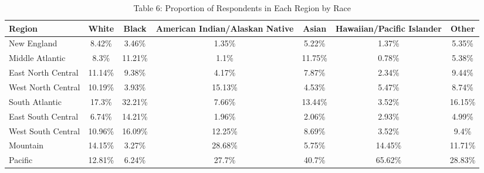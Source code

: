 \documentclass{article}
\begin{document}
\begin{table}[ht]
\centering
\caption*{Table 6: Proportion of Respondents in Each Region by Race} 
\begin{tabular}{lcccccc}
  \hline
 Region & White & Black & American Indian/Alaskan Native & Asian & Hawaiian/Pacific Islander & Other \\ 
  \hline
  New England & 8.42\% & 3.46\% & 1.35\% & 5.22\% & 1.37\% & 5.35\% \\ 
  Middle Atlantic & 8.3\% & 11.21\% & 1.1\% & 11.75\% & 0.78\% & 5.38\% \\ 
  East North Central & 11.14\% & 9.38\% & 4.17\% & 7.87\% & 2.34\% & 9.44\% \\ 
  West North Central & 10.19\% & 3.93\% & 15.13\% & 4.53\% & 5.47\% & 8.74\% \\ 
  South Atlantic & 17.3\% & 32.21\% & 7.66\% & 13.44\% & 3.52\% & 16.15\% \\ 
  East South Central & 6.74\% & 14.21\% & 1.96\% & 2.06\% & 2.93\% & 4.99\% \\ 
  West South Central & 10.96\% & 16.09\% & 12.25\% & 8.69\% & 3.52\% & 9.4\% \\ 
  Mountain & 14.15\% & 3.27\% & 28.68\% & 5.75\% & 14.45\% & 11.71\% \\ 
  Pacific & 12.81\% & 6.24\% & 27.7\% & 40.7\% & 65.62\% & 28.83\% \\ 
   \hline
\end{tabular}
\end{table}
\end{document}
